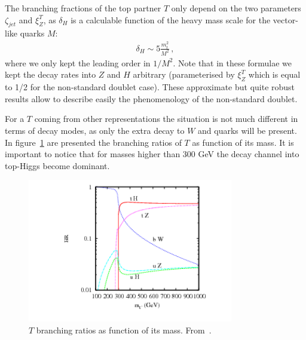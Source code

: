 The branching fractions of the top partner $T$ only depend on the two parameters $\zeta_{jet}$ and $\xi_Z^{T}$, as $\delta_H$ is a calculable function of the heavy mass scale for the vector-like quarks $M$:
\begin{eqnarray} 
\delta_H  \sim 5 \frac{m^2_t}{M^2}\,, \label{eq:deltaH}
\end{eqnarray} 
where we only kept the leading order in $1/M^2$. Note that in these formulae we kept the decay rates into $Z$ and $H$ arbitrary (parameterised by $\xi_Z^{T}$ which is equal to 1/2 for the non-standard doublet case). These approximate but quite robust results allow to describe easily the phenomenology of the non-standard doublet. 

For a $T$ coming from other representations the situation is not much different in terms of decay modes, as only the extra decay to $W$ and quarks will be present. In figure~\ref{fig:TBRs} are presented the branching ratios of $T$ as function of its mass. It is important to notice that for masses higher than 300 GeV the decay channel into top-Higgs become dominant.

\begin{figure}[!Hhtbp]
  \begin{center}
    \includegraphics[width=0.8\textwidth]{figs/pheno_br_tp.png}
    \caption{$T$ branching ratios as function of its mass. From~\cite{Cacciapaglia:2011fx}.}
    \label{fig:TBRs}
  \end{center}
\end{figure}

